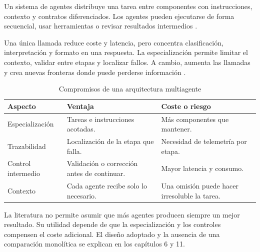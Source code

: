 Un sistema de agentes distribuye una tarea entre componentes con instrucciones, contexto y contratos diferenciados. Los agentes pueden ejecutarse de forma secuencial, usar herramientas o revisar resultados intermedios \citep{wang2024agentsurvey,mialon2024augmented}.

Una única llamada reduce coste y latencia, pero concentra clasificación, interpretación y formato en una respuesta. La especialización permite limitar el contexto, validar entre etapas y localizar fallos. A cambio, aumenta las llamadas y crea nuevas fronteras donde puede perderse información \citep{anthropic-effective-agents}.

\begin{table}[H]
\centering
\small
\caption{Compromisos de una arquitectura multiagente}
\label{tab:ventajas_riesgos_multiagente}
\begin{tabular}{|P{3.6cm}|P{4.6cm}|P{4.6cm}|}
\hline
\textbf{Aspecto} & \textbf{Ventaja} & \textbf{Coste o riesgo} \\
\hline
Especialización & Tareas e instrucciones acotadas. & Más componentes que mantener. \\
\hline
Trazabilidad & Localización de la etapa que falla. & Necesidad de telemetría por etapa. \\
\hline
Control intermedio & Validación o corrección antes de continuar. & Mayor latencia y consumo. \\
\hline
Contexto & Cada agente recibe solo lo necesario. & Una omisión puede hacer irresoluble la tarea. \\
\hline
\end{tabular}
\end{table}

La literatura no permite asumir que más agentes producen siempre un mejor resultado. Su utilidad depende de que la especialización y los controles compensen el coste adicional. El diseño adoptado y la ausencia de una comparación monolítica se explican en los capítulos 6 y 11.
